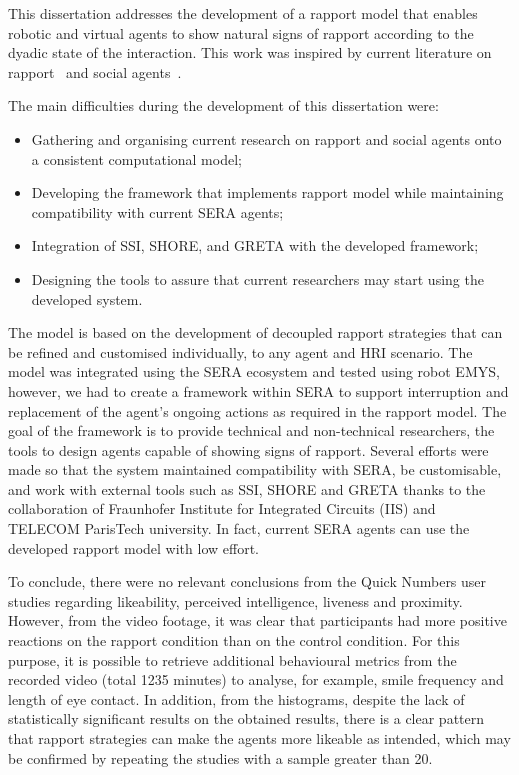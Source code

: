 \label{chap:conclusions}

This dissertation addresses the development of a rapport model that enables robotic and virtual agents to show natural signs of rapport according to the dyadic state of the interaction. This work was inspired by current literature on rapport~\cite{Buschmeier2011, Spencer-Oatey2005, Zhao2014, Papangelis2014} and social agents~\cite{Zwiers2011, Reidsma2011, Riek2009, Niewiadomski2009, Andrist2014, Andrist2015, Cassell2007, Wang2009, Schroder2010, Buschmeier2011, Tullio2015}.

The main difficulties during the development of this dissertation were:
\begin{itemize}
	\item Gathering and organising current research on rapport and social agents onto a consistent computational model;
	\item Developing the framework that implements rapport model while maintaining compatibility with current \ac{SERA} agents;
	\item Integration of \ac{SSI}, SHORE, and GRETA with the developed framework;
	\item Designing the tools to assure that current researchers may start using the developed system.
\end{itemize}

The model is based on the development of decoupled rapport strategies that can be refined and customised individually, to any agent and \ac{HRI} scenario. The model was integrated using the \ac{SERA} ecosystem and tested using robot \ac{EMYS}, however, we had to create a framework within \ac{SERA} to support interruption and replacement of the agent's ongoing actions as required in the rapport model. The goal of the framework is to provide technical and non-technical researchers, the tools to design agents capable of showing signs of rapport. Several efforts were made so that the system maintained compatibility with \ac{SERA}, be customisable, and work with external tools such as \ac{SSI}, SHORE and GRETA thanks to the collaboration of Fraunhofer Institute for Integrated Circuits (IIS) and TELECOM ParisTech university. In fact, current \ac{SERA} agents can use the developed rapport model with low effort.

To conclude, there were no relevant conclusions from the Quick Numbers user studies regarding likeability, perceived intelligence, liveness and proximity. However, from the video footage, it was clear that participants had more positive reactions on the rapport condition than on the control condition. For this purpose, it is possible to retrieve additional behavioural metrics from the recorded video (total 1235 minutes) to analyse, for example, smile frequency and length of eye contact. In addition, from the histograms, despite the lack of statistically significant results on the obtained results, there is a clear pattern that rapport strategies can make the agents more likeable as intended, which may be confirmed by repeating the studies with a sample greater than 20.




